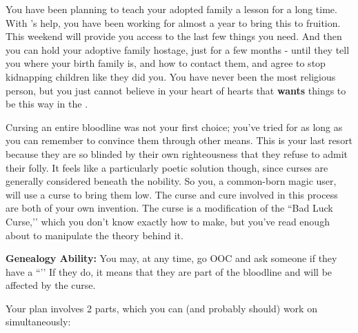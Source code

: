\documentclass[green]{GL2020}
\begin{document}
\name{\gPunishKidnappers{}}

You have been planning to teach your adopted family a lesson for a long time. With \cLibAssist{\full}’s help, you have been working for almost a year to bring this to fruition. This weekend will provide you access to the last few things you need. And then you can hold your adoptive family hostage, just for a few months - until they tell you where your birth family is, and how to contact them, and agree to stop kidnapping children like they did you. You have never been the most religious person, but you just cannot believe in your heart of hearts that \cFarmGod{} \textbf{wants} things to be this way in the \pFarm{}.

Cursing an entire bloodline was not your first choice; you’ve tried for as long as you can remember to convince them through other means. This is your last resort because they are so blinded by their own righteousness that they refuse to admit their folly. It feels like a particularly poetic solution though, since curses are generally considered beneath the nobility. So you, a common-born magic user, will use a curse to bring them low. The curse and cure involved in this process are both of your own invention. The curse is a modification of the ``Bad Luck Curse,’’ which you don’t know exactly how to make, but you’ve read enough about to manipulate the theory behind it.

\textbf{Genealogy Ability:} You may, at any time, go OOC and ask someone if they have a ``\mCPacket{\MYname}’’ If they do, it means that they are part of the \cAdopted{\formal} bloodline and will be affected by the curse.

Your plan involves 2 parts, which you can (and probably should) work on simultaneously:
\end{document}
